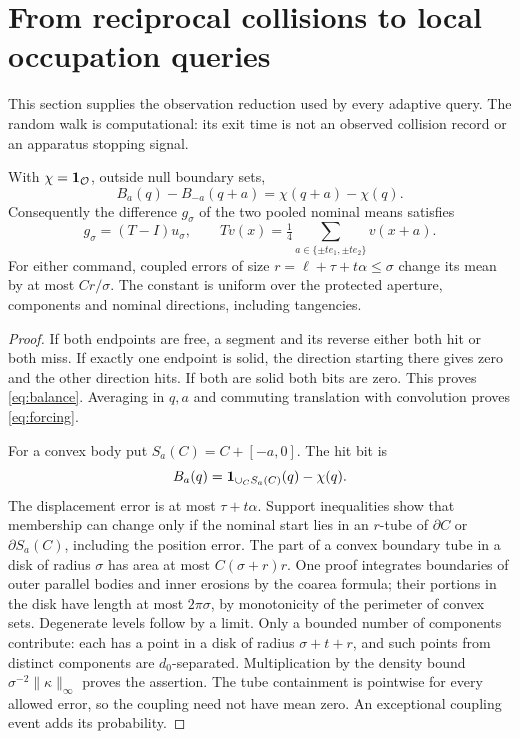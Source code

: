 \section{From reciprocal collisions to local occupation queries}
\label{sec:queries}
This section supplies the observation reduction used by every adaptive
query. The random walk is computational: its exit time is not an
observed collision record or an apparatus stopping signal.

\begin{lemma}\label{lem:balance}
With $\chi=\mathbf 1_{\mathcal O}$, outside null boundary sets,
\begin{equation}\label{eq:balance}
 B_a(q)-B_{-a}(q+a)=\chi(q+a)-\chi(q).
\end{equation}
Consequently the difference $g_\sigma$ of the two pooled nominal means
satisfies
\begin{equation}\label{eq:forcing}
 g_\sigma=(T-I)u_\sigma,\qquad
 Tv(x)=\tfrac14\sum_{a\in\{\pm te_1,\pm te_2\}}v(x+a).
\end{equation}
For either command, coupled errors of size
$r=\ell+\tau+t\alpha\le\sigma$ change its mean by at most $Cr/\sigma$.
The constant is uniform over the protected aperture, components and
nominal directions, including tangencies.
\end{lemma}
\begin{proof}
If both endpoints are free, a segment and its reverse either both hit
or both miss. If exactly one endpoint is solid, the direction starting
there gives zero and the other direction hits. If both are solid both
bits are zero. This proves \eqref{eq:balance}. Averaging in $q,a$ and
commuting translation with convolution proves \eqref{eq:forcing}.

For a convex body put $S_a(C)=C+[-a,0]$. The hit bit is
\[
 B_a(q)=\mathbf 1_{\cup_C S_a(C)}(q)-\chi(q).
\]
The displacement error is at most $\tau+t\alpha$. Support inequalities
show that membership can change only if the nominal start lies in
an $r$-tube of $\partial C$ or $\partial S_a(C)$, including the position
error. The part of a convex boundary tube in a disk of radius $\sigma$
has area at most $C(\sigma+r)r$. One proof integrates boundaries of
outer parallel bodies and inner erosions by the coarea formula; their
portions in the disk have length at most $2\pi\sigma$, by monotonicity
of the perimeter of convex sets. Degenerate levels follow by a limit.
Only a bounded number of components contribute: each has a point in
a disk of radius $\sigma+t+r$, and such points from distinct components
are $d_0$-separated. Multiplication by the density bound
$\sigma^{-2}\|\kappa\|_\infty$ proves the assertion. The tube containment
is pointwise for every allowed error, so the coupling need not have
mean zero. An exceptional coupling event adds its probability.
\end{proof}

